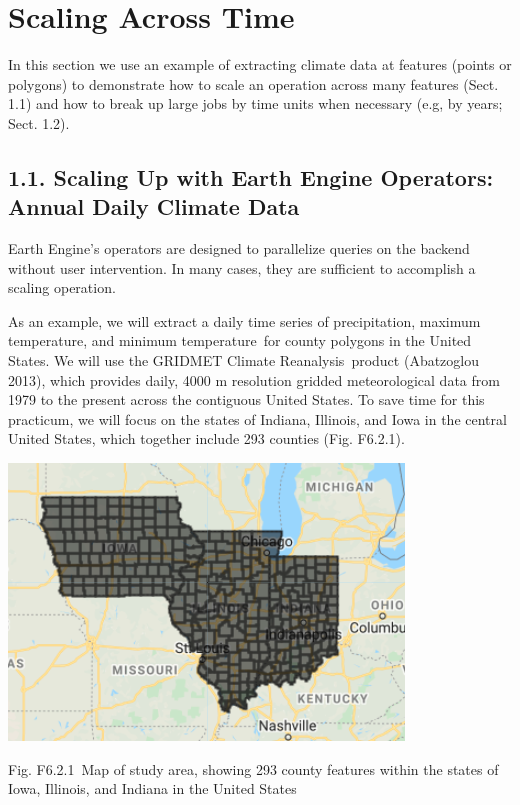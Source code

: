 \documentclass[
  letterpaper,
  DIV=11,
  numbers=noendperiod]{scrreprt}
\begin{document}
\hypertarget{scaling-across-time}{%
\section{Scaling Across Time}\label{scaling-across-time}}

In this section we use an example of extracting climate data at features
(points or polygons) to demonstrate how to scale an operation across
many features (Sect. 1.1) and how to break up large jobs by time units
when necessary (e.g, by years; Sect. 1.2).

\hypertarget{scaling-up-with-earth-engine-operators-annual-daily-climate-data}{%
\subsection{1.1. Scaling Up with Earth Engine Operators: Annual Daily
Climate
Data}\label{scaling-up-with-earth-engine-operators-annual-daily-climate-data}}

Earth Engine's operators are designed to parallelize queries on the
backend without user intervention. In many cases, they are sufficient to
accomplish a scaling operation.

As an example, we will extract a daily time series of precipitation,
maximum temperature, and minimum temperature~for county polygons in the
United States. We will use the GRIDMET Climate Reanalysis~product
(Abatzoglou 2013), which provides daily, 4000 m resolution gridded
meteorological data from 1979 to the present across the contiguous
United States. To save time for this practicum, we will focus on the
states of Indiana, Illinois, and Iowa in the central United States,
which together include 293 counties (Fig. F6.2.1).

\includegraphics{./F6/image11.png}

Fig. F6.2.1~Map of study area, showing 293 county features within the
states of Iowa, Illinois, and Indiana in the United States
\end{document}
